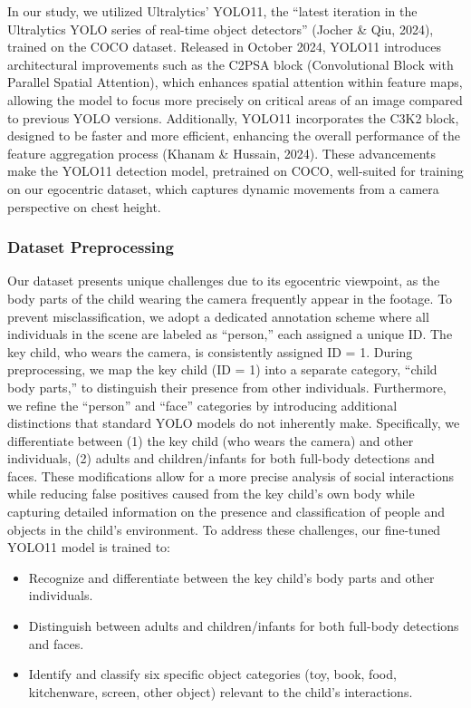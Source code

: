 \documentclass[
  man,floatsintext]{apa6}
\providecommand{\tightlist}{%
  \setlength{\itemsep}{0pt}\setlength{\parskip}{0pt}}
\begin{document}
In our study, we utilized Ultralytics' YOLO11, the ``latest iteration in the Ultralytics YOLO series of real-time object detectors'' (Jocher \& Qiu, 2024), trained on the COCO dataset. Released in October 2024, YOLO11 introduces architectural improvements such as the C2PSA block (Convolutional Block with Parallel Spatial Attention), which enhances spatial attention within feature maps, allowing the model to focus more precisely on critical areas of an image compared to previous YOLO versions. Additionally, YOLO11 incorporates the C3K2 block, designed to be faster and more efficient, enhancing the overall performance of the feature aggregation process (Khanam \& Hussain, 2024). These advancements make the YOLO11 detection model, pretrained on COCO, well-suited for training on our egocentric dataset, which captures dynamic movements from a camera perspective on chest height.

\subsubsection{Dataset Preprocessing}\label{dataset-preprocessing}

Our dataset presents unique challenges due to its egocentric viewpoint, as the body parts of the child wearing the camera frequently appear in the footage. To prevent misclassification, we adopt a dedicated annotation scheme where all individuals in the scene are labeled as ``person,'' each assigned a unique ID. The key child, who wears the camera, is consistently assigned ID = 1. During preprocessing, we map the key child (ID = 1) into a separate category, ``child body parts,'' to distinguish their presence from other individuals. Furthermore, we refine the ``person'' and ``face'' categories by introducing additional distinctions that standard YOLO models do not inherently make. Specifically, we differentiate between (1) the key child (who wears the camera) and other individuals, (2) adults and children/infants for both full-body detections and faces. These modifications allow for a more precise analysis of social interactions while reducing false positives caused from the key child's own body while capturing detailed information on the presence and classification of people and objects in the child's environment. To address these challenges, our fine-tuned YOLO11 model is trained to:

\begin{itemize}
\tightlist
\item
  Recognize and differentiate between the key child's body parts and other individuals.
\item
  Distinguish between adults and children/infants for both full-body detections and faces.
\item
  Identify and classify six specific object categories (toy, book, food, kitchenware, screen, other object) relevant to the child's interactions.
\end{itemize}
\end{document}
